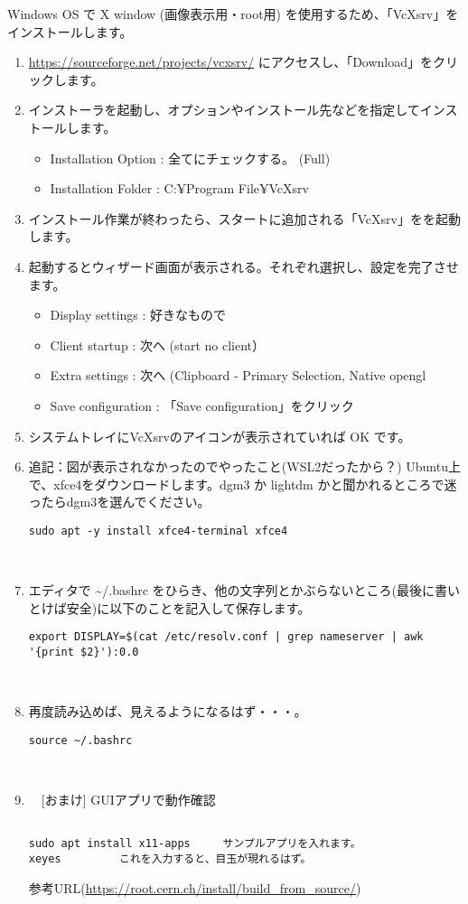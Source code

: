 Windows OS で X window (画像表示用・root用) を使用するため、「VcXsrv」をインストールします。
\begin{enumerate}
  \item \url{https://sourceforge.net/projects/vcxsrv/} にアクセスし、「Download」をクリックします。
  \item インストーラを起動し、オプションやインストール先などを指定してインストールします。
        \begin{itemize}
          \item Installation Option : 全てにチェックする。 (Full)
          \item Installation Folder : C:¥Program File¥VcXsrv
        \end{itemize}
  \item インストール作業が終わったら、スタートに追加される「VcXsrv」をを起動します。
  \item 起動するとウィザード画面が表示される。それぞれ選択し、設定を完了させます。
        \begin{itemize}
          \item Display settings : 好きなもので
          \item Client startup : 次へ (start no client）
          \item Extra settings : 次へ (Clipboard - Primary Selection, Native opengl
          \item Save configuration : 「Save configuration」をクリック
        \end{itemize}
  \item システムトレイにVcXsrvのアイコンが表示されていれば OK です。

  \item 追記：図が表示されなかったのでやったこと(WSL2だったから？) Ubuntu上で、xfce4をダウンロードします。dgm3 か lightdm かと聞かれるところで迷ったらdgm3を選んでください。
\begin{lstlisting}
sudo apt -y install xfce4-terminal xfce4
\end{lstlisting}
　\item エディタで \textasciitilde/.bashrc をひらき、他の文字列とかぶらないところ(最後に書いとけば安全)に以下のことを記入して保存します。
\begin{lstlisting}
export DISPLAY=$(cat /etc/resolv.conf | grep nameserver | awk '{print $2}'):0.0
\end{lstlisting}
　\item 再度読み込めば、見えるようになるはず・・・。
\begin{lstlisting}
source ~/.bashrc
\end{lstlisting}
　\item　[おまけ] GUIアプリで動作確認
\begin{lstlisting}　　　　
sudo apt install x11-apps     サンプルアプリを入れます。
xeyes         これを入力すると、目玉が現れるはず。
\end{lstlisting}

参考URL(\url{https://root.cern.ch/install/build_from_source/})
\end{enumerate}


